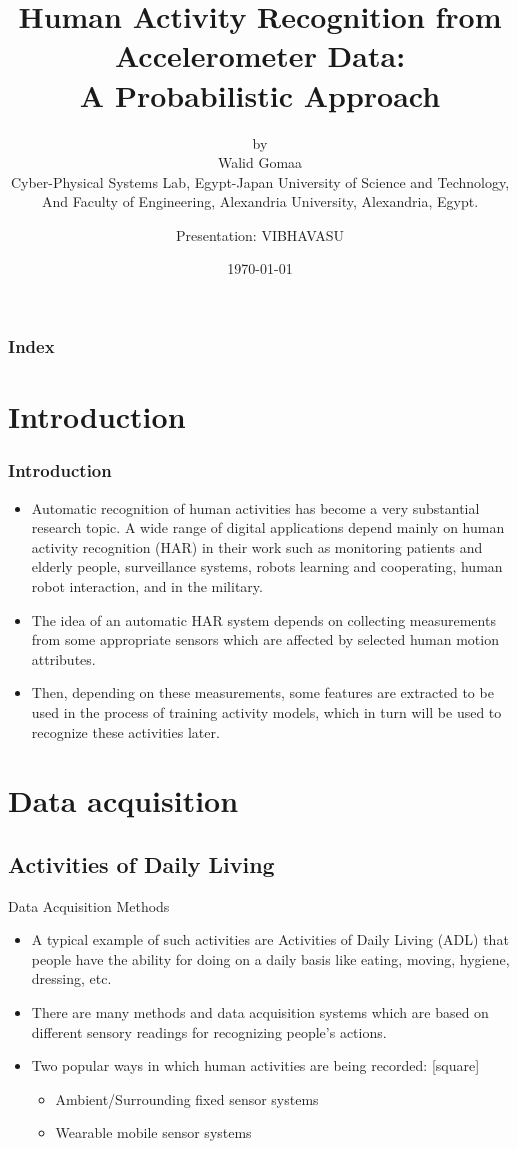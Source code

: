 \documentclass{beamer}
\title{Human Activity Recognition from Accelerometer Data:\\A Probabilistic Approach}
\subtitle{by\\ Walid Gomaa\\Cyber-Physical Systems Lab, Egypt-Japan University of Science and Technology, And Faculty of Engineering, Alexandria University, Alexandria, Egypt. 
}
\author{Presentation: VIBHAVASU}
\institute{Indian Institute of Technology Hyderabad}
\date{\today}
\begin{document}
\begin{frame}
    \titlepage
\end{frame}
\begin{frame}
\frametitle{Index}
\tableofcontents
\end{frame}

\section{Introduction}
\begin{frame}
\frametitle{Introduction}
\begin{itemize}
    \item Automatic recognition of human activities has become a very substantial research topic. A wide range of digital applications depend mainly on human activity recognition (HAR) in their work such as monitoring patients and elderly people, surveillance systems, robots learning and cooperating, human robot interaction, and in the military.
    \item The idea of an automatic HAR system depends on collecting measurements from some appropriate sensors which are affected by selected human motion attributes.
    \item Then, depending on these measurements, some features are extracted to be used in the process of training activity models, which in turn will be used to recognize these activities later.
\end{itemize}
\end{frame}

\section{Data acquisition}
\subsection{Activities of Daily Living}
\begin{frame}{Data Acquisition Methods}
  \begin{itemize}
    \item A typical example of such activities are Activities of Daily Living (ADL) that people have the ability for doing on a daily basis like eating, moving, hygiene, dressing, etc.
    \item There are many methods and data acquisition systems which are based on different sensory readings for recognizing people’s actions.\\
    \item Two popular ways in which human activities are being recorded: 
    [square]
    \begin{itemize}
        \item Ambient/Surrounding fixed sensor systems
        \item Wearable mobile sensor systems
    \end{itemize}
\end{itemize}
\end{frame}
\end{document}
